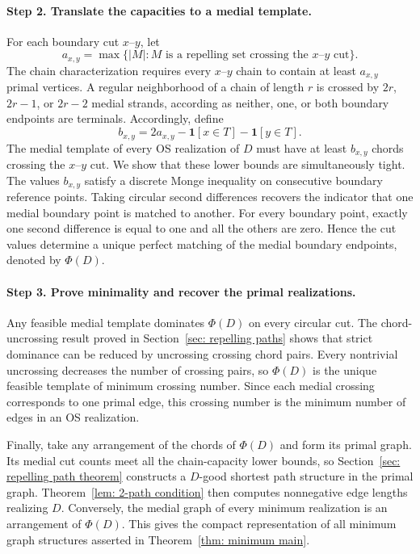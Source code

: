 \documentclass[11pt]{article}
\begin{document}
\paragraph{Step 2. Translate the capacities to a medial template.}
For each boundary cut $x$--$y$, let
\[
a_{x,y}=\max\{|M|:M\text{ is a repelling set crossing the $x$--$y$ cut}\}.
\]
The chain characterization requires every $x$--$y$ chain to contain at least $a_{x,y}$ primal vertices. A regular neighborhood of a chain of length $r$ is crossed by $2r$, $2r-1$, or $2r-2$ medial strands, according as neither, one, or both boundary endpoints are terminals. Accordingly, define
\[
b_{x,y}=2a_{x,y}-\mathbf 1[x\in T]-\mathbf 1[y\in T].
\]
The medial template of every OS realization of $D$ must have at least $b_{x,y}$ chords crossing the $x$--$y$ cut. We show that these lower bounds are simultaneously tight. The values $b_{x,y}$ satisfy a discrete Monge inequality on consecutive boundary reference points. Taking circular second differences recovers the indicator that one medial boundary point is matched to another. For every boundary point, exactly one second difference is equal to one and all the others are zero. Hence the cut values determine a unique perfect matching of the medial boundary endpoints, denoted by $\Phi(D)$.

\paragraph{Step 3. Prove minimality and recover the primal realizations.}
Any feasible medial template dominates $\Phi(D)$ on every circular cut. The chord-uncrossing result proved in Section~\ref{sec: repelling paths} shows that strict dominance can be reduced by uncrossing crossing chord pairs. Every nontrivial uncrossing decreases the number of crossing pairs, so $\Phi(D)$ is the unique feasible template of minimum crossing number. Since each medial crossing corresponds to one primal edge, this crossing number is the minimum number of edges in an OS realization.

Finally, take any arrangement of the chords of $\Phi(D)$ and form its primal graph. Its medial cut counts meet all the chain-capacity lower bounds, so Section~\ref{sec: repelling path theorem} constructs a $D$-good shortest path structure in the primal graph. Theorem~\ref{lem: 2-path condition} then computes nonnegative edge lengths realizing $D$. Conversely, the medial graph of every minimum realization is an arrangement of $\Phi(D)$. This gives the compact representation of all minimum graph structures asserted in Theorem~\ref{thm: minimum main}.
\end{document}
